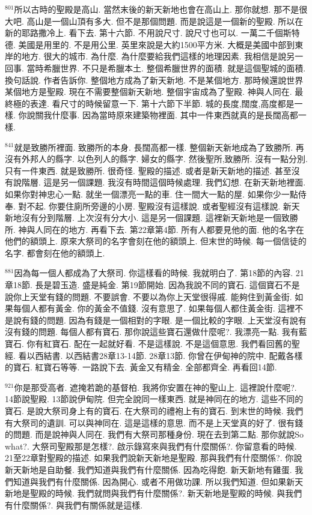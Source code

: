 \documentclass{book}
\begin{document}
$^{801}$所以古時的聖殿是高山.
當然末後的新天新地也會在高山上.
那你就想.
那不是很大吧.
高山是一個山頂有多大.
但不是那個問題.
而是說這是一個新的聖殿.
所以在新的耶路撒冷上.
看下去.
第十六節.
不用說尺寸.
說尺寸也可以.
一萬二千個斯特德.
美國是用里的.
不是用公里.
英里來說是大約1500平方米.
大概是美國中部到東岸的地方.
很大的城市.
為什麼.
為什麼要給我們這樣的地理因素.
我相信是說另一回事.
當時希臘世界.
不只是希臘本土.
整個希臘世界的面積.
就是這個聖城的面積.
換句話說.
作者告訴你.
整個地方成為了新天新地.
不是某個地方.
那時候還說世界某個地方是聖殿.
現在不需要整個新天新地.
整個宇宙成為了聖殿.
神與人同在.
最終極的表達.
看尺寸的時候留意一下.
第十六節下半節.
城的長度,闊度,高度都是一樣.
你說關我什麼事.
因為當時原來建築物裡面.
其中一件東西就真的是長闊高都一樣.

$^{841}$就是致勝所裡面.
致勝所的本身.
長闊高都一樣.
整個新天新地成為了致勝所.
再沒有外邦人的縣字.
以色列人的縣字.
婦女的縣字.
然後聖所,致勝所.
沒有一點分別.
只有一件東西.
就是致勝所.
很奇怪.
聖殿的描述.
或者是新天新地的描述.
甚至沒有說階層.
這是另一個課題.
我沒有時間這個時候處理.
我們幻想.
在新天新地裡面.
如果你對神忠心一點.
就坐一個漂亮一點的車.
住一間大一點的屋.
如果你少一點侍奉.
對不起.
你要住廁所旁邊的小房.
聖殿沒有這樣說.
或者聖經沒有這樣說.
新天新地沒有分到階層.
上次沒有分大小.
這是另一個課題.
這裡新天新地是一個致勝所.
神與人同在的地方.
再看下去.
第22章第4節.
所有人都要見他的面.
他的名字在他們的額頭上.
原來大祭司的名字會刻在他的額頭上.
但末世的時候.
每一個信徒的名字.
都會刻在他的額頭上.

$^{881}$因為每一個人都成為了大祭司.
你這樣看的時候.
我就明白了.
第18節的內容.
21章18節.
長是碧玉造.
盛是純金.
第19節開始.
因為我說不同的寶石.
這個寶石不是說你上天堂有錢的問題.
不要誤會.
不要以為你上天堂很得戚.
能夠住到黃金街.
如果每個人都有黃金.
你的黃金不值錢.
沒有意思了.
如果每個人都住黃金街.
這裡不是說有錢的問題.
因為有錢是一個相對的字眼.
是一個比較的字眼.
上天堂沒有說有沒有錢的問題.
每個人都有寶石.
那你說這些寶石還做什麼呢?.
我漂亮一點.
我有藍寶石.
你有紅寶石.
配在一起就好看.
不是這樣說.
不是這個意思.
我們看回舊的聖經.
看以西結書.
以西結書28章13-14節.
28章13節.
你曾在伊甸神的院中.
配戴各樣的寶石.
紅寶石等等.
一路說下去.
黃金又有精金.
全部都齊全.
再看回14節.

$^{921}$你是那受高者.
遮掩若跪的基督柏.
我將你安置在神的聖山上.
這裡說什麼呢?.
14節說聖殿.
13節說伊甸院.
但完全說同一樣東西.
就是神同在的地方.
這些不同的寶石.
是說大祭司身上有的寶石.
在大祭司的禮袍上有的寶石.
到末世的時候.
我們有大祭司的遺訓.
可以與神同在.
這是這樣的意思.
而不是上天堂真的好了.
很有錢的問題.
而是說神與人同在.
我們有大祭司那種身份.
現在去到第二點.
那你就說So what?.
大祭司聖殿那是怎樣?.
啟示錄寫來與我們有什麼關係?.
你留意看的時候.
21至22章對聖殿的描述.
如果我們說新天新地是聖殿.
那與我們有什麼關係?.
你說新天新地是自助餐.
我們知道與我們有什麼關係.
因為吃得飽.
新天新地有雞蛋.
我們知道與我們有什麼關係.
因為開心.
或者不用做功課.
所以我們知道.
但如果新天新地是聖殿的時候.
我們就問與我們有什麼關係?.
新天新地是聖殿的時候.
與我們有什麼關係?.
與我們有關係就是這樣.
\end{document}
